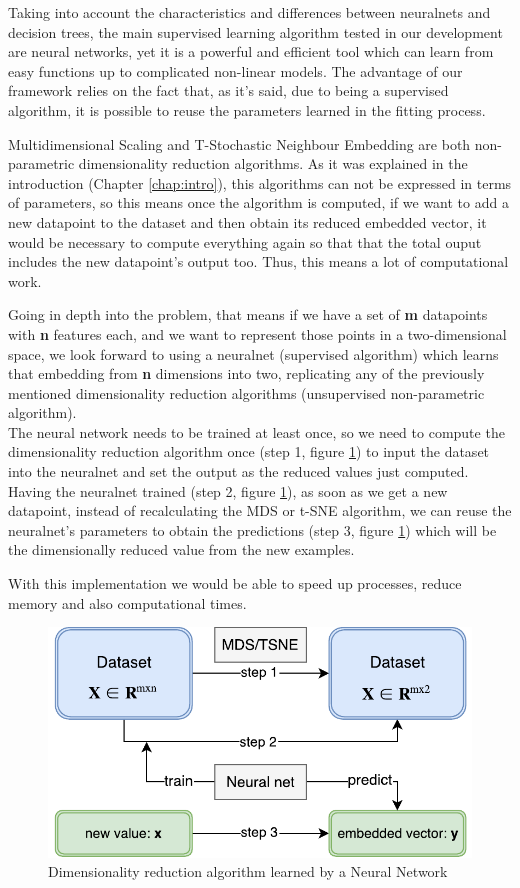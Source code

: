 \documentclass[a4paper,11pt,spanish]{report}
\begin{document}
Taking into account the characteristics and differences between neuralnets and decision trees, the main supervised learning algorithm tested in our development are neural networks, yet it is a powerful and efficient tool which can learn from easy functions up to complicated non-linear models. The advantage of our framework relies on the fact that, as it's said, due to being a supervised algorithm, it is possible to reuse the parameters learned in the fitting process.

Multidimensional Scaling and T-Stochastic Neighbour Embedding are both non-parametric dimensionality reduction algorithms. As it was explained in the introduction (Chapter \ref{chap:intro}), this algorithms can not be expressed in terms of parameters, so this means once the algorithm is computed, if we want to add a new datapoint to the dataset and then obtain its reduced embedded vector, it would be necessary to compute everything again so that that the total ouput includes the new datapoint's output too. Thus, this means a lot of computational work.

Going in depth into the problem, that means if we have a set of \textbf{m} datapoints with \textbf{n} features each, and we want to represent those points in a two-dimensional space, we look forward to using a neuralnet (supervised algorithm) which learns that embedding from \textbf{n} dimensions into two, replicating any of the previously mentioned dimensionality reduction algorithms (unsupervised non-parametric algorithm).\\ The neural network needs to be trained at least once, so we need to compute the dimensionality reduction algorithm once (step 1, figure \ref{figurenet}) to input the dataset into the neuralnet and set the output as the reduced values just computed. Having the neuralnet trained (step 2, figure \ref{figurenet}), as soon as we get a new datapoint, instead of recalculating the MDS or t-SNE algorithm, we can reuse the neuralnet's parameters to obtain the predictions (step 3, figure \ref{figurenet}) which will be the dimensionally reduced value from the new examples.

With this implementation we would be able to speed up processes, reduce memory and also computational times.\\

\begin{figure}[h]
\centering
\includegraphics[width=12cm]{figures/neuralnet.pdf}
\caption{\label{figurenet}Dimensionality reduction algorithm learned by a Neural Network}
\end{figure}
\end{document}

